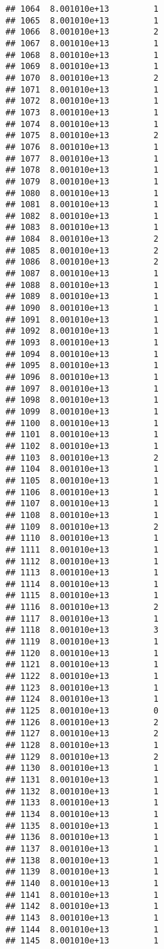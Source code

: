 \documentclass[
]{article}
\begin{document}
\begin{verbatim}
## 1064  8.001010e+13         1
## 1065  8.001010e+13         1
## 1066  8.001010e+13         2
## 1067  8.001010e+13         1
## 1068  8.001010e+13         1
## 1069  8.001010e+13         1
## 1070  8.001010e+13         2
## 1071  8.001010e+13         1
## 1072  8.001010e+13         1
## 1073  8.001010e+13         1
## 1074  8.001010e+13         1
## 1075  8.001010e+13         2
## 1076  8.001010e+13         1
## 1077  8.001010e+13         1
## 1078  8.001010e+13         1
## 1079  8.001010e+13         1
## 1080  8.001010e+13         1
## 1081  8.001010e+13         1
## 1082  8.001010e+13         1
## 1083  8.001010e+13         1
## 1084  8.001010e+13         2
## 1085  8.001010e+13         2
## 1086  8.001010e+13         2
## 1087  8.001010e+13         1
## 1088  8.001010e+13         1
## 1089  8.001010e+13         1
## 1090  8.001010e+13         1
## 1091  8.001010e+13         1
## 1092  8.001010e+13         1
## 1093  8.001010e+13         1
## 1094  8.001010e+13         1
## 1095  8.001010e+13         1
## 1096  8.001010e+13         1
## 1097  8.001010e+13         1
## 1098  8.001010e+13         1
## 1099  8.001010e+13         1
## 1100  8.001010e+13         1
## 1101  8.001010e+13         1
## 1102  8.001010e+13         1
## 1103  8.001010e+13         2
## 1104  8.001010e+13         1
## 1105  8.001010e+13         1
## 1106  8.001010e+13         1
## 1107  8.001010e+13         1
## 1108  8.001010e+13         1
## 1109  8.001010e+13         2
## 1110  8.001010e+13         1
## 1111  8.001010e+13         1
## 1112  8.001010e+13         1
## 1113  8.001010e+13         1
## 1114  8.001010e+13         1
## 1115  8.001010e+13         1
## 1116  8.001010e+13         2
## 1117  8.001010e+13         1
## 1118  8.001010e+13         3
## 1119  8.001010e+13         1
## 1120  8.001010e+13         1
## 1121  8.001010e+13         1
## 1122  8.001010e+13         1
## 1123  8.001010e+13         1
## 1124  8.001010e+13         1
## 1125  8.001010e+13         0
## 1126  8.001010e+13         2
## 1127  8.001010e+13         2
## 1128  8.001010e+13         1
## 1129  8.001010e+13         2
## 1130  8.001010e+13         1
## 1131  8.001010e+13         1
## 1132  8.001010e+13         1
## 1133  8.001010e+13         1
## 1134  8.001010e+13         1
## 1135  8.001010e+13         1
## 1136  8.001010e+13         1
## 1137  8.001010e+13         1
## 1138  8.001010e+13         1
## 1139  8.001010e+13         1
## 1140  8.001010e+13         1
## 1141  8.001010e+13         1
## 1142  8.001010e+13         1
## 1143  8.001010e+13         1
## 1144  8.001010e+13         1
## 1145  8.001010e+13         1

\end{verbatim}
\end{document}
